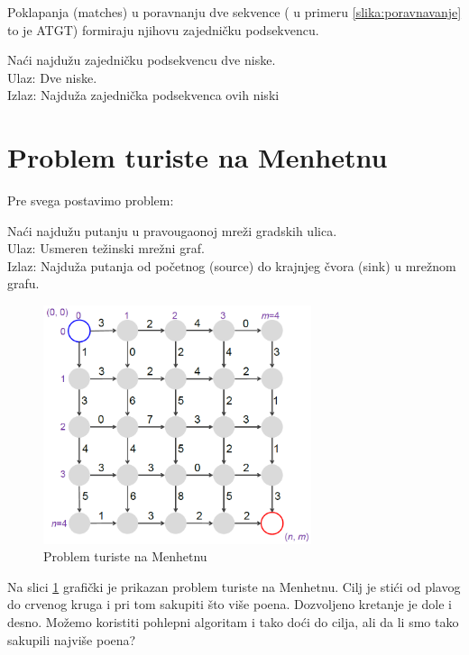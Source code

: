 Poklapanja (matches) u poravnanju dve sekvence ( u primeru \ref{slika:poravnavanje} to je ATGT) formiraju njihovu zajedničku podsekvencu.
\begin{problem}
	Naći najdužu zajedničku podsekvencu dve niske. \\
	Ulaz: Dve niske. \\
	Izlaz: Najduža zajednička podsekvenca ovih niski
\end{problem}

\section{Problem turiste na Menhetnu}

\noindent Pre svega postavimo problem:\\

\begin{problem}
	Naći najdužu putanju u pravougaonoj mreži gradskih ulica. \\
	Ulaz: Usmeren težinski mrežni graf. \\
	Izlaz: Najduža putanja od početnog (source) do krajnjeg čvora (sink) u mrežnom grafu. 
\end{problem}

\begin{figure}[h!]
\centering
\includegraphics[width=0.7\textwidth]{poglavlja/5/slike/menhetn2.png}
\caption{Problem turiste na Menhetnu}
\label{slika:menhetn}
\end{figure} 

Na slici \ref{slika:menhetn} grafički je prikazan problem turiste na Menhetnu. Cilj je stići od plavog do crvenog kruga i pri tom sakupiti što više poena. Dozvoljeno kretanje je dole i desno. Možemo koristiti pohlepni algoritam i tako doći do cilja, ali da li smo tako sakupili najviše poena?

